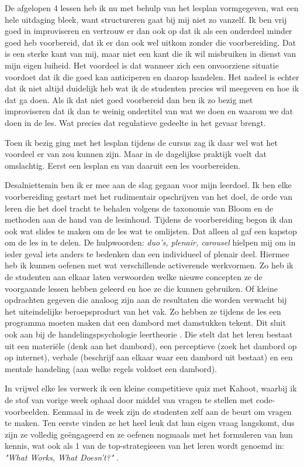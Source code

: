 De afgelopen 4 lessen heb ik nu met behulp van het lesplan vormgegeven, wat een hele uitdaging bleek, want structureren gaat bij mij niet zo vanzelf. Ik ben vrij goed in improviseren en vertrouw er dan ook op dat ik als een onderdeel minder goed heb voorbereid, dat ik er dan ook wel uitkom zonder die voorbereiding. Dat is een sterke kant van mij, maar niet een kant die ik wil misbruiken in dienst van mijn eigen luiheid. Het voordeel is dat wanneer zich een onvoorziene situatie voordoet dat ik die goed kan anticiperen en daarop handelen. Het nadeel is echter dat ik niet altijd duidelijk heb wat ik de studenten precies wil meegeven en hoe ik dat ga doen.
Als ik dat niet goed voorbereid dan ben ik zo bezig met improviseren dat ik dan te weinig ondertitel van wat we doen en waarom we dat doen in de les. Wat precies dat regulatieve gedeelte in het gevaar brengt.

Toen ik bezig ging met het lesplan tijdens de cursus zag ik daar wel wat het voordeel er van zou kunnen zijn. Maar in de dagelijkse praktijk voelt dat omslachtig. Eerst een lesplan en van daaruit een les voorbereiden.

Desalniettemin ben ik er mee aan de slag gegaan voor mijn leerdoel. Ik ben elke voorbereiding gestart met het rudimentair opschrijven van het doel, de orde van leren die het doel tracht te behalen volgens de taxonomie van Bloom en de methoden aan de hand van de lesinhoud. Tijdens de voorbereiding begon ik dan ook wat slides te maken om de les wat te omlijsten. Dat alleen al gaf een kapstop om de les in te delen. De hulpwoorden: \textit{duo's, plenair, carousel} hielpen mij om in ieder geval iets anders te bedenken dan een individueel of plenair deel. Hiermee heb ik kunnen oefenen met wat verschillende activerende werkvormen. Zo heb ik de studenten aan elkaar laten verwoorden welke nieuwe concepten ze de voorgaande lessen hebben geleerd en hoe ze die kunnen gebruiken. Of kleine opdrachten gegeven die analoog zijn aan de resultaten die worden verwacht bij het uiteindelijke beroepsproduct van het vak. Zo hebben ze tijdens de les een programma moeten maken dat een dambord met damstukken tekent. Dit sluit ook aan bij de handelingspsychologie leertheorie \cite[p.417]{kallenberg2014leren}. Die stelt dat het leren bestaat uit een materiële (denk aan het dambord), een perceptieve (zoek het dambord op op internet), verbale (beschrijf aan elkaar waar een dambord uit bestaat) en een mentale handeling (aan welke regels voldoet een dambord). 

In vrijwel elke les verwerk ik een kleine competitieve quiz met Kahoot, waarbij ik de stof van vorige week ophaal door middel van vragen te stellen met code-voorbeelden. Eenmaal in de week zijn de studenten zelf aan de beurt om vragen te maken. Ten eerste vinden ze het heel leuk dat hun eigen vraag langskomt, dus zijn ze volledig geëngageerd en ze oefenen nogmaals met het formuleren van hun kennis, wat ook als 1 van de top-strategieeen van het leren wordt genoemd in: \textit{"What Works, What Doesn't?"} \cite{dunlosky2013}.

